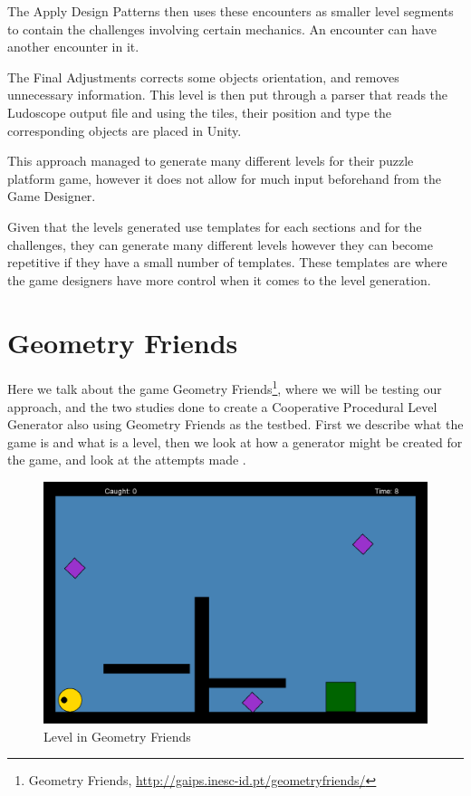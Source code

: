 \documentclass[runningheads]{llncs}
\begin{document}
The Apply Design Patterns then uses these encounters as smaller level segments to contain the challenges involving certain mechanics. An encounter can have another encounter in it. 

The Final Adjustments corrects some objects orientation, and removes unnecessary information. This level is then put through a parser that reads the Ludoscope output file and using the tiles, their position and type the corresponding objects are placed in Unity.

This approach managed to generate many different levels for their puzzle platform game, however it does not allow for much input beforehand from the Game Designer.

Given that the levels generated use templates for each sections and for the challenges, they can generate many different levels however they can become repetitive if they have a small number of templates. These templates are where the game designers have more control when it comes to the level generation.

\section{Geometry Friends}



Here we talk about the game Geometry Friends\footnote{Geometry Friends,  \href{http://gaips.inesc-id.pt/geometryfriends/}{http://gaips.inesc-id.pt/geometryfriends/}}, where we will be testing our approach, and the two studies done to create a Cooperative Procedural Level Generator also using Geometry Friends as the testbed. First we describe what the game is and what is a level, then we look at how a generator might be created for the game, and look at the attempts made
. 
\begin{figure}
    \centering
    \includegraphics[scale=0.25]{images/levelexample.png}
    \caption{Level in Geometry Friends}
    \label{fig:level}
\end{figure}
\end{document}
